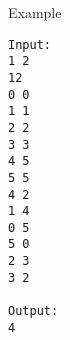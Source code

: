 Example
\begin{verbatim}
Input:
1 2
12
0 0
1 1
2 2
3 3
4 5
5 5
4 2
1 4
0 5
5 0
2 3
3 2

Output:
4
\end{verbatim}